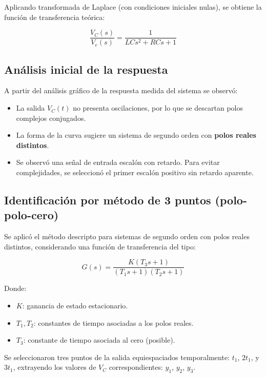 \documentclass{article}
\begin{document}
Aplicando transformada de Laplace (con condiciones iniciales nulas), se obtiene la función de transferencia teórica:

\begin{equation}
\frac{V_C(s)}{V_e(s)} = \frac{1}{LC s^2 + RC s + 1}
\end{equation}

\subsection*{Análisis inicial de la respuesta}
A partir del análisis gráfico de la respuesta medida del sistema se observó:

\begin{itemize}
    \item La salida $V_C(t)$ no presenta oscilaciones, por lo que se descartan polos complejos conjugados.
    \item La forma de la curva sugiere un sistema de segundo orden con \textbf{polos reales distintos}.
    \item Se observó una señal de entrada escalón con retardo. Para evitar complejidades, se seleccionó el primer escalón positivo sin retardo aparente.
\end{itemize}

\subsection*{Identificación por método de 3 puntos (polo-polo-cero)}
Se aplicó el método descripto para sistemas de segundo orden con polos reales distintos, considerando una función de transferencia del tipo:

\begin{equation}
G(s) = \frac{K(T_3 s + 1)}{(T_1 s + 1)(T_2 s + 1)}
\end{equation}

Donde:
\begin{itemize}
    \item $K$: ganancia de estado estacionario.
    \item $T_1, T_2$: constantes de tiempo asociadas a los polos reales.
    \item $T_3$: constante de tiempo asociada al cero (posible).
\end{itemize}

Se seleccionaron tres puntos de la salida equiespaciados temporalmente: $t_1$, $2t_1$, y $3t_1$, extrayendo los valores de $V_C$ correspondientes: $y_1$, $y_2$, $y_3$.
\end{document}
